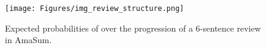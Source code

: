 \begin{figure}
  \centering
  \texttt{[image: Figures/img\_review\_structure.png]}
  \caption{Expected probabilities of \taxtypes{} over the progression of a 6-sentence review in AmaSum.}
  \label{fig_review_structure}
\end{figure}